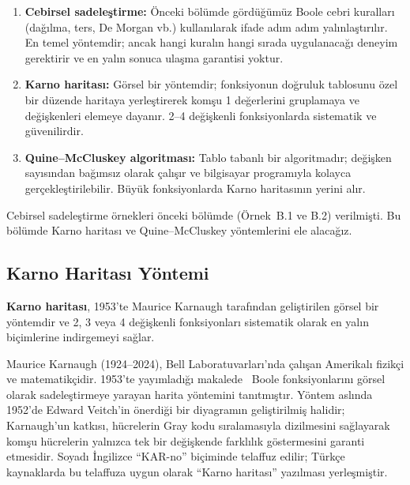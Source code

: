 \begin{enumerate}[nosep]
    \item \textbf{Cebirsel sadeleştirme:} Önceki bölümde gördüğümüz Boole cebri kuralları (dağılma, ters, De Morgan vb.) kullanılarak ifade adım adım yalınlaştırılır. En temel yöntemdir; ancak hangi kuralın hangi sırada uygulanacağı deneyim gerektirir ve en yalın sonuca ulaşma garantisi yoktur.
    \item \textbf{Karno haritası:} Görsel bir yöntemdir; fonksiyonun doğruluk tablosunu özel bir düzende haritaya yerleştirerek komşu 1 değerlerini gruplamaya ve değişkenleri elemeye dayanır. 2--4 değişkenli fonksiyonlarda sistematik ve güvenilirdir.
    \item \textbf{Quine--McCluskey algoritması:} Tablo tabanlı bir algoritmadır; değişken sayısından bağımsız olarak çalışır ve bilgisayar programıyla kolayca gerçekleştirilebilir. Büyük fonksiyonlarda Karno haritasının yerini alır.
\end{enumerate}

\noindent Cebirsel sadeleştirme örnekleri önceki bölümde (Örnek~B.1 ve B.2) verilmişti. Bu bölümde Karno haritası ve Quine--McCluskey yöntemlerini ele alacağız.

\subsection{Karno Haritası Yöntemi}

\textbf{Karno haritası}, 1953'te Maurice Karnaugh tarafından geliştirilen görsel bir yöntemdir ve 2, 3 veya 4 değişkenli fonksiyonları sistematik olarak en yalın biçimlerine indirgemeyi sağlar.

\begin{bilginot}
Maurice Karnaugh (1924--2024), Bell Laboratuvarları'nda çalışan Amerikalı fizikçi ve matematikçidir. 1953'te yayımladığı makalede~\cite{karnaugh1953} Boole fonksiyonlarını görsel olarak sadeleştirmeye yarayan harita yöntemini tanıtmıştır. Yöntem aslında 1952'de Edward Veitch'in önerdiği bir diyagramın geliştirilmiş halidir; Karnaugh'un katkısı, hücrelerin Gray kodu sıralamasıyla dizilmesini sağlayarak komşu hücrelerin yalnızca tek bir değişkende farklılık göstermesini garanti etmesidir. Soyadı İngilizce ``KAR-no'' biçiminde telaffuz edilir; Türkçe kaynaklarda bu telaffuza uygun olarak ``Karno haritası'' yazılması yerleşmiştir.
\end{bilginot}

